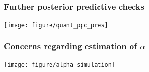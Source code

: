 \documentclass{beamer}
\begin{document}
\appendix

\begin{frame}
  \frametitle{Further posterior predictive checks}
  
  \texttt{[image: figure/quant\_ppc\_pres]}
\end{frame}

\begin{frame}
  \frametitle{Concerns regarding estimation of \(\alpha\)}
  
  \texttt{[image: figure/alpha\_simulation]}
\end{frame}
\end{document}
